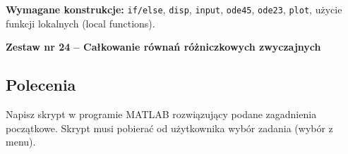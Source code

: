 \documentclass[a4paper,11pt]{article}
\begin{document}
\vspace{0.3cm}
\begin{ramka}
\textbf{Wymagane konstrukcje:}
\texttt{if/else}, \texttt{disp}, \texttt{input}, \texttt{ode45}, \texttt{ode23}, \texttt{plot}, użycie funkcji lokalnych (local functions).
\end{ramka}

\clearpage
\begin{center}
  {\large\bfseries Zestaw nr 24 \quad -- \quad Całkowanie równań różniczkowych zwyczajnych}
\end{center}
\hrulefill
\vspace{0.4cm}

\subsection*{Polecenia}

Napisz skrypt w programie MATLAB rozwiązujący podane zagadnienia początkowe. Skrypt musi pobierać od użytkownika wybór zadania (wybór z menu).
\end{document}
